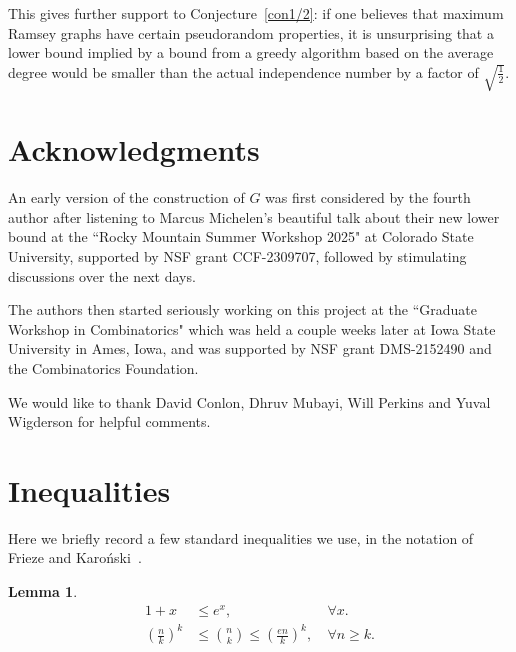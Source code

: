 \documentclass{article}
\newtheorem{lemma}[theorem]{Lemma}
\begin{document}
This gives further support to Conjecture~\ref{con1/2}: if one believes that maximum Ramsey graphs have certain pseudorandom properties, it is unsurprising that a lower bound implied by a bound from a greedy algorithm based on the average degree would be smaller than the actual independence number by a factor of $\sqrt{\frac12}$. 




\section{Acknowledgments}

An early version of the construction of $G$ was first considered by the fourth author after listening to Marcus Michelen's beautiful talk about their new lower bound at the ``Rocky Mountain Summer Workshop 2025" at Colorado State University, supported by NSF grant CCF-2309707, followed by stimulating discussions over the next days.

The authors then started seriously working on this project at the ``Graduate Workshop in Combinatorics" which was held a couple weeks later at Iowa State University in Ames, Iowa, and was supported by NSF grant DMS-2152490 and the Combinatorics Foundation. 

We would like to thank David Conlon, Dhruv Mubayi, Will Perkins and Yuval Wigderson for helpful comments.


 



\appendix
\section{Inequalities}
Here we briefly record a few standard inequalities we use, in the notation of Frieze and Karo\'nski~\cite{FriezeKarBook}.

\begin{lemma}
\label{binIE}
\begin{align*}
    1+x&\le e^x,~&\forall x.\\
    \left(\frac{n}{k}\right)^k&\le \binom{n}{k}\le \left(\frac{en}{k}\right)^k,~&\forall n\ge k.
\end{align*}
\end{lemma}
\end{document}
